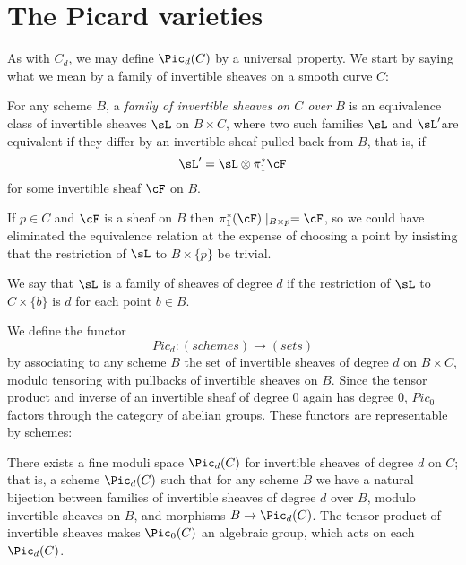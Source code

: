 
\section{The Picard varieties}

As with $C_d$, we may define $\Pic_d(C)$ by a universal property. We start by saying what we mean by a family of invertible sheaves on a smooth curve $C$:

\begin{definition}
 For any scheme $B$, a \emph{family of invertible sheaves on $C$ over $B$} is an equivalence class of invertible sheaves $\sL$ on $B\times C$, where two such
 families $\sL$ and $\sL'$are equivalent if they differ by an invertible sheaf pulled back from $B$, that is, if
 $$
 \sL' = \sL \otimes \pi_1^*\cF
 $$
for some invertible sheaf $\cF$ on $B$.
 \end{definition}

If $p \in C$ and $\cF$ is a sheaf on $B$ then $\pi_1^*(\cF)\mid_{B\times p} = \cF$, so we could have eliminated the
equivalence relation at the expense of choosing a point by insisting that the restriction of $\sL$ to $B \times \{p\}$ be trivial.
 
 

 
We say that $\sL$  is a family of sheaves of degree $d$ if the restriction of $\sL$
 to $C\times \{b\}$ is $d$ for each point $b\in B$. 
 
We define the functor
 $$
 Pic_d : (schemes) \to (sets)
 $$
 by associating to any scheme $B$ the set of invertible sheaves of degree $d$ on $B \times C$, modulo tensoring with pullbacks of invertible sheaves on $B$. Since the tensor product and inverse of an invertible sheaf of degree 0 again has degree 0, 
 $Pic_0$ factors through the category of abelian groups. These functors are representable by schemes:
  
 \begin{fact}\cite[Theorem 9.4.8]{Kleiman-PicardScheme}
 There exists a fine moduli space $\Pic_d(C)$ for invertible sheaves of degree $d$ on $C$; that is, a scheme $\Pic_d(C)$ such that for any scheme $B$ we have a natural bijection between families of invertible sheaves of degree $d$ over $B$, modulo invertible sheaves on $B$, and morphisms $B \to \Pic_d(C)$. The tensor product of invertible sheaves makes $\Pic_0(C)$ an algebraic group, which acts on each $\Pic_d(C)$.
 \end{fact}
 
